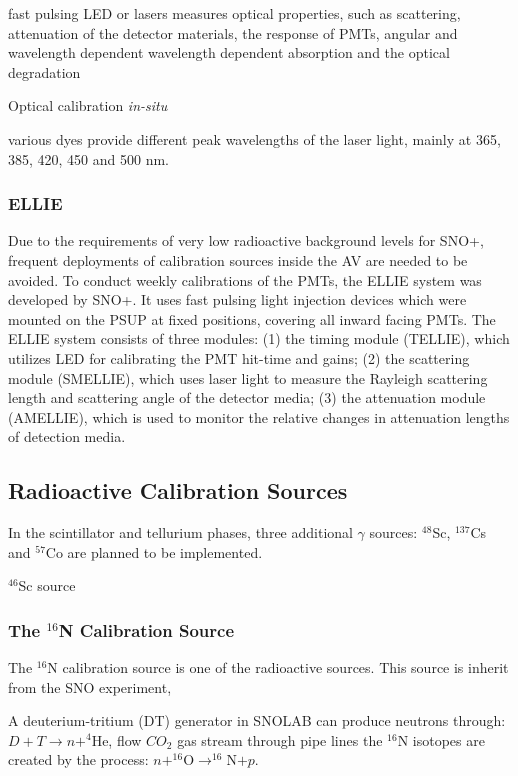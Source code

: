 fast pulsing LED or lasers
measures optical properties, such as scattering, attenuation of the detector materials, the response of PMTs, 
angular and wavelength dependent
wavelength dependent absorption and the optical degradation

Optical calibration {\emph {in-situ}} 

various dyes provide different peak wavelengths of the laser light, mainly at 365, 385, 420, 450 and 500 nm.

\subsubsection{ELLIE}
Due to the requirements of very low radioactive background levels for SNO+, frequent deployments of calibration sources inside the AV are needed to be avoided. To conduct weekly calibrations of the PMTs, the ELLIE system was developed by SNO+. It uses fast pulsing light injection devices which were mounted on the PSUP at fixed positions, covering all inward facing PMTs. The ELLIE system consists of three modules: (1) the timing module (TELLIE), which utilizes LED for calibrating the PMT hit-time and gains; (2) the scattering module (SMELLIE), which uses laser light to measure the Rayleigh scattering length and scattering angle of the detector media; (3) the attenuation module (AMELLIE), which is used to monitor the relative changes in attenuation lengths of detection media\cite{jones2011background,walker2016study,dunger2018topological,snop_jinst}.

\subsection{Radioactive Calibration Sources}
In the scintillator and tellurium phases, three additional $\gamma$ sources: $^{48}$Sc, $^{137}$Cs and $^{57}$Co are planned to be implemented.

$^{46}$Sc source

\subsubsection{The $^{16}$N Calibration Source}

The $^{16}$N calibration source is one of the radioactive sources. This source is inherit from the SNO experiment\cite{dragowsky1999sudbury,dragowsky200216n,hamer2001energy}, 

A deuterium-tritium (DT) generator in SNOLAB can produce neutrons through: $D+T\to n+^{4}$He, 
flow $CO_2$ gas stream through pipe lines the $^{16}$N isotopes are created by the process: $n+^{16}$O$\to^{16}$N$+p$. 

